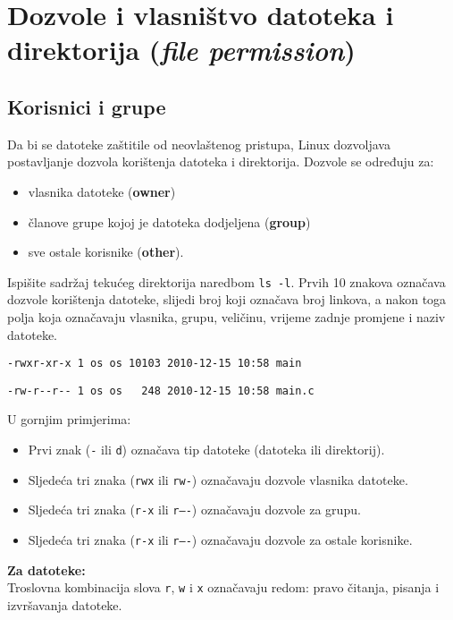 \section{Dozvole i vlasništvo datoteka i direktorija (\textit{file permission})}
\subsection*{Korisnici i grupe}
Da bi se datoteke zaštitile od neovlaštenog pristupa, Linux dozvoljava postavljanje dozvola korištenja datoteka i direktorija. Dozvole se određuju za:
\begin{itemize}
\item vlasnika datoteke (\textbf{owner})
\item članove grupe kojoj je datoteka dodjeljena (\textbf{group})
\item sve ostale korisnike (\textbf{other}).
\end{itemize}
\begin{primjer} Ispišite sadržaj tekućeg direktorija naredbom \texttt{ls -l}. Prvih 10 znakova označava dozvole korištenja datoteke, slijedi broj koji označava broj linkova, a nakon toga polja koja označavaju vlasnika, grupu, veličinu, 
vrijeme zadnje promjene i naziv datoteke.

\lstinline!-rwxr-xr-x 1 os os 10103 2010-12-15 10:58 main !

\lstinline!-rw-r--r-- 1 os os   248 2010-12-15 10:58 main.c!
\end{primjer}

U gornjim primjerima:
\begin{itemize}
\item Prvi znak (\texttt{-} ili \texttt{d}) označava tip datoteke (datoteka ili direktorij).
\item Sljedeća tri znaka (\texttt{rwx} ili \texttt{rw-}) označavaju dozvole vlasnika datoteke.
\item Sljedeća tri znaka (\texttt{r-x} ili \texttt{r----}) označavaju dozvole za grupu.
\item Sljedeća tri znaka (\texttt{r-x} ili \texttt{r----}) označavaju dozvole za ostale korisnike.
\end{itemize}

\textbf{Za datoteke:}\\
Troslovna kombinacija slova \texttt{r}, \texttt{w} i \texttt{x} označavaju redom: pravo čitanja, pisanja i izvršavanja datoteke.\\

